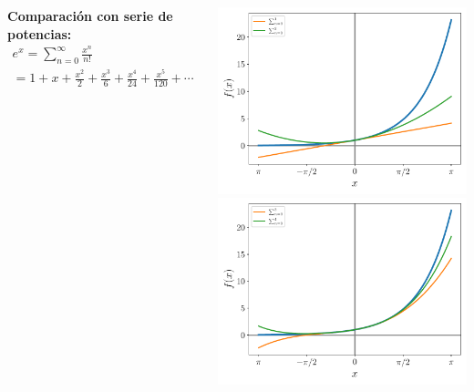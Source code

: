 \documentclass[9pt, aspectratio=169]{beamer}
\begin{document}
\begin{frame}
\begin{columns}[t]
\cx
\textbf{Comparación con serie de potencias:}
\begin{multline*}
e^x = \sum_{n = 0}^{\infty} \frac{x^n}{n!} \\
= 1 + x + \frac{x^2}{2} + \frac{x^3}{6} + \frac{x^4}{24} + \frac{x^5}{120} + \cdots
\end{multline*}
\begin{center}
     {\includegraphics[scale=0.45]{figs/pot-12.pdf}}
     {\includegraphics[scale=0.45]{figs/pot-34.pdf}}
\end{center}
\end{columns}
\end{frame}
\end{document}

